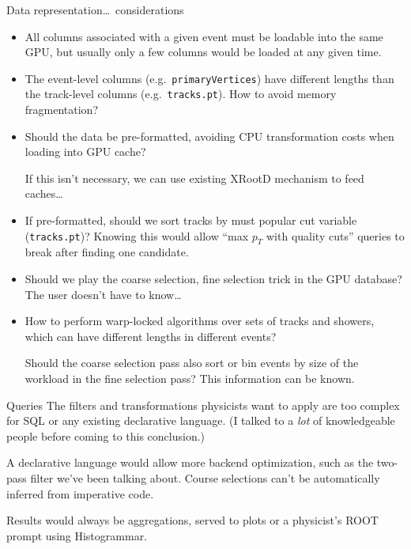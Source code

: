 \documentclass{beamer}
\begin{document}
\begin{frame}{Data representation\ldots\ considerations}
\scriptsize
\begin{itemize}\setlength{\itemsep}{0.25 cm}
\item All columns associated with a given event must be loadable into the same GPU, but usually only a few columns would be loaded at any given time.

\item The event-level columns (e.g.\ {\tt primaryVertices}) have different lengths than the track-level columns (e.g.\ {\tt tracks.pt}). How to avoid memory fragmentation?

\item Should the data be pre-formatted, avoiding CPU transformation costs when loading into GPU cache?

If this isn't necessary, we can use existing XRootD mechanism to feed caches\ldots

\item If pre-formatted, should we sort tracks by must popular cut variable ({\tt tracks.pt})? Knowing this would allow ``max $p_T$ with quality cuts'' queries to break after finding one candidate.

\item Should we play the coarse selection, fine selection trick in the GPU database? The user doesn't have to know\ldots

\item How to perform warp-locked algorithms over sets of tracks and showers, which can have different lengths in different events?

Should the coarse selection pass also sort or bin events by size of the workload in the fine selection pass? This information can be known.
\end{itemize}
\end{frame}

\begin{frame}{Queries}
The filters and transformations physicists want to apply are too complex for SQL or any existing declarative language. (I talked to a {\it lot} of knowledgeable people before coming to this conclusion.)

\vspace{0.5 cm}
A declarative language would allow more backend optimization, such as the two-pass filter we've been talking about. Course selections can't be automatically inferred from imperative code.

\vspace{0.5 cm}
Results would always be aggregations, served to plots or a physicist's ROOT prompt using Histogrammar.
\end{frame}
\end{document}
